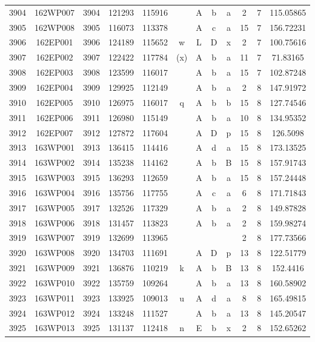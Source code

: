 \begin{tabular}{|*{12}{c|}}
3904 & 162WP007 & 3904 & 121293 & 115916 &  & A & b & a & 2 & 7 & 115.05865 \\ 
3905 & 162WP008 & 3905 & 116073 & 113378 &  & A & c & a & 15 & 7 & 156.72231 \\ 
3906 & 162EP001 & 3906 & 124189 & 115652 & w & L & D & x & 2 & 7 & 100.75616 \\ 
3907 & 162EP002 & 3907 & 122422 & 117784 & (x) & A & b & a & 11 & 7 & 71.83165 \\ 
3908 & 162EP003 & 3908 & 123599 & 116017 &  & A & b & a & 15 & 7 & 102.87248 \\ 
3909 & 162EP004 & 3909 & 129925 & 112149 &  & A & b & a & 2 & 8 & 147.91972 \\ 
3910 & 162EP005 & 3910 & 126975 & 116017 & q & A & b & b & 15 & 8 & 127.74546 \\ 
3911 & 162EP006 & 3911 & 126980 & 115149 &  & A & b & a & 10 & 8 & 134.95352 \\ 
3912 & 162EP007 & 3912 & 127872 & 117604 &  & A & D & p & 15 & 8 & 126.5098 \\ 
3913 & 163WP001 & 3913 & 136415 & 114416 &  & A & d & a & 15 & 8 & 173.13525 \\ 
3914 & 163WP002 & 3914 & 135238 & 114162 &  & A & b & B & 15 & 8 & 157.91743 \\ 
3915 & 163WP003 & 3915 & 136293 & 112659 &  & A & b & a & 15 & 8 & 157.24448 \\ 
3916 & 163WP004 & 3916 & 135756 & 117755 &  & A & c & a & 6 & 8 & 171.71843 \\ 
3917 & 163WP005 & 3917 & 132526 & 117329 &  & A & b & a & 2 & 8 & 149.87828 \\ 
3918 & 163WP006 & 3918 & 131457 & 113823 &  & A & b & a & 2 & 8 & 159.98274 \\ 
3919 & 163WP007 & 3919 & 132699 & 113965 &  &  &  &  & 2 & 8 & 177.73566 \\ 
3920 & 163WP008 & 3920 & 134703 & 111691 &  & A & D & p & 13 & 8 & 122.51779 \\ 
3921 & 163WP009 & 3921 & 136876 & 110219 & k & A & b & B & 13 & 8 & 152.4416 \\ 
3922 & 163WP010 & 3922 & 135759 & 109264 &  & A & b & a & 13 & 8 & 160.58902 \\ 
3923 & 163WP011 & 3923 & 133925 & 109013 & u & A & d & a & 8 & 8 & 165.49815 \\ 
3924 & 163WP012 & 3924 & 133248 & 111527 &  & A & b & a & 13 & 8 & 145.20547 \\ 
3925 & 163WP013 & 3925 & 131137 & 112418 & n & E & b & x & 2 & 8 & 152.65262 \\ 

\end{tabular}
